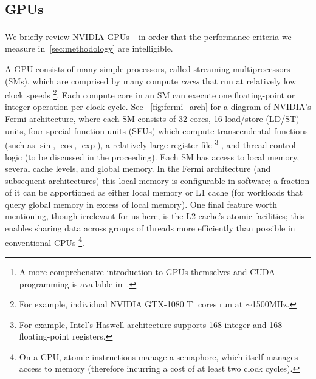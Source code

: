 \subsection{GPUs}\label{subsec:gpus}

We briefly review NVIDIA GPUs%
\footnote{A more comprehensive introduction to GPUs themselves and CUDA programming is available in~\cite{10.5555/2935593}.}
in order that the performance criteria we measure in~\cref{sec:methodology} are intelligible.

A GPU consists of many simple processors, called streaming multiprocessors (SMs), which are comprised by many compute \textit{cores} that run at relatively low clock speeds%
\footnote{For example, individual NVIDIA GTX-1080 Ti cores run at $\sim$1500MHz.}.
Each compute core in an SM can execute one floating-point or integer operation per clock cycle.
See ~\cref{fig:fermi_arch} for a diagram of NVIDIA's Fermi architecture, where each SM consists of 32 cores, 16 load/store (LD/ST) units, four special-function units (SFUs) which compute transcendental functions (such as $\sin$, $\cos$, $\exp$), a relatively large register file%
\footnote{For example, Intel's Haswell architecture supports 168 integer and 168 floating-point registers.}%
, and thread control logic (to be discussed in the proceeding).
Each SM has access to local memory, several cache levels, and global memory.
In the Fermi architecture (and subsequent architectures) this local memory is configurable in software;
a fraction of it can be apportioned as either local memory or L1 cache (for workloads that query global memory in excess of local memory).
One final feature worth mentioning, though irrelevant for us here, is the L2 cache's atomic  facilities;
this enables sharing data across groups of threads more efficiently than possible in conventional CPUs%
\footnote{On a CPU, atomic  instructions manage a semaphore, which itself manages access to memory (therefore incurring a cost of at least two clock cycles).}.

